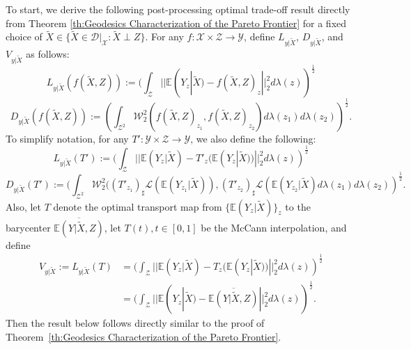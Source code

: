 \documentclass[twoside,11pt]{article}
\begin{document}
To start, we derive the following post-processing optimal trade-off result directly from Theorem \ref{th:Geodesics Characterization of the Pareto Frontier} for a fixed choice of $\tilde{X} \in \{ \tilde{X} \in \mathcal{D}|_{\mathcal{X}}: \tilde{X} \perp Z\}$. For any $f: \mathcal{X} \times \mathcal{Z} \rightarrow \mathcal{Y}$, define $L_{y|\tilde{X}}$, $D_{y|\tilde{X}}$, and $V_{y|\tilde{X}}$ as follows:
\begin{equation}
L_{y|\tilde{X}}(f(\tilde{X},Z)) :=  (\int_{\mathcal{Z}} ||\mathbb{E}(Y_z|\tilde{X}) - f(\tilde{X},Z)_z||_2^2 d\lambda(z))^{\frac{1}{2}}
\end{equation}
\begin{equation} 
D_{y|\tilde{X}}(f(\tilde{X},Z)):= (\int_{\mathcal{Z}^2} \mathcal{W}_2^2(f(\tilde{X},Z)_{z_1} ,f(\tilde{X},Z)_{z_2}) d\lambda({z_1})d\lambda({z_2}))^{\frac{1}{2}}.
\end{equation}
To simplify notation, for any $T': \mathcal{Y} \times \mathcal{Z} \rightarrow \mathcal{Y}$, we also define the following:
\begin{equation}
L_{y|\tilde{X}}(T') :=  (\int_{\mathcal{Z}} ||\mathbb{E}(Y_z|\tilde{X}) - T'_z(\mathbb{E}(Y_z|\tilde{X}) )||_2^2 d\lambda(z))^{\frac{1}{2}}
\end{equation}
\begin{equation} 
D_{y|\tilde{X}}(T'):= (\int_{\mathcal{Z}^2} \mathcal{W}_2^2((T'_{z_1})_{\sharp}\mathcal{L}(\mathbb{E}(Y_{z_1}|\tilde{X})),(T'_{z_2})_{\sharp}\mathcal{L}(\mathbb{E}(Y_{z_2}|\tilde{X}) d\lambda({z_1})d\lambda({z_2}))^{\frac{1}{2}}.
\end{equation}
Also, let $T$ denote the optimal transport map from $\{\mathbb{E}(Y_z|\tilde{X})\}_z$ to the barycenter $\overline{\mathbb{E}(Y|\tilde{X},Z)}$, let $T(t), t \in [0,1]$ be the McCann interpolation, and define
\begin{align}
V_{y|\tilde{X}} := L_{y|\tilde{X}}(T) & =( \int_{\mathcal{Z}} ||\mathbb{E}(Y_z|\tilde{X}) - T_z(\mathbb{E}(Y_z|\tilde{X}) )||_2^2 d\lambda(z))^{\frac{1}{2}}\\
& = ( \int_{\mathcal{Z}} ||\mathbb{E}(Y_z|\tilde{X}) - \overline{\mathbb{E}(Y|\tilde{X},Z)}||_2^2 d\lambda(z) )^{\frac{1}{2}}.
\end{align} 
Then the result below follows directly similar to the proof of Theorem~\ref{th:Geodesics Characterization of the Pareto Frontier}.
\end{document}
